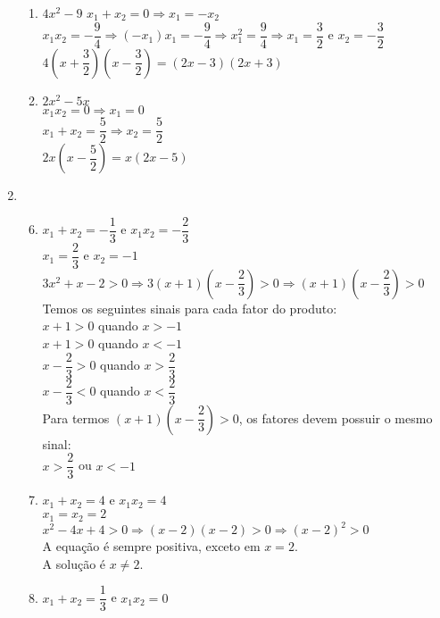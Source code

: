 \documentclass[10pt]{book}
\begin{document}
\begin{enumerate}
\begin{enumerate}
				
				\item %
				$4x^2 - 9$
				$x_{1} + x_{2} = 0 \Rightarrow x_{1} = -x_{2}$\\
				$x_{1}x_{2} = -\dfrac{9}{4} \Rightarrow (-x_{1})x_{1} = -\dfrac{9}{4} \Rightarrow x_{1}^2 = \dfrac{9}{4} \Rightarrow x_{1} = \dfrac{3}{2}$ e $x_{2} = -\dfrac{3}{2}$\\
				$4(x+\dfrac{3}{2})(x-\dfrac{3}{2}) = \boxed{(2x-3)(2x+3)}$
				\item %
				$2x^2 - 5x$\\
			 	$x_{1}x_{2} = 0 \Rightarrow x_{1} = 0$\\
			 	$x_{1} + x_{2} = \dfrac{5}{2} \Rightarrow x_{2}  = \dfrac{5}{2}$\\
			 	$2x(x-\dfrac{5}{2}) = \boxed{x(2x-5)}$
		\end{enumerate}
	\item %
		\begin{enumerate}
			\setcounter{enumii}{5}
			\item %
			$x_{1}+x_{2}= -\dfrac{1}{3}$ e $x_{1}x_{2}=-\dfrac{2}{3} $\\[6pt]
			$x_{1}=\dfrac{2}{3}$ e $x_{2}=-1$\\[6pt]
			$3x^2+x-2 > 0 \Rightarrow 3(x+1)(x-\dfrac{2}{3}) > 0 \Rightarrow (x+1)(x-\dfrac{2}{3}) > 0$\\[6pt]
			Temos os seguintes sinais para cada fator do produto:\\
			$x + 1 > 0$ quando $x > -1$\\
			$x + 1 > 0$ quando $x < -1$\\
			$x-\dfrac{2}{3} > 0$ quando $x > \dfrac{2}{3}$\\[6pt]
			$x-\dfrac{2}{3} < 0$ quando $x < \dfrac{2}{3}$\\[6pt]
			Para termos $(x+1)(x-\dfrac{2}{3}) > 0$, os fatores devem possuir o mesmo sinal:\\
			$x > \dfrac{2}{3}$ ou  $x < -1$
			\item %
			$x_{1}+x_{2}= 4$ e $x_{1}x_{2}= 4$\\
			$x_{1} = x_{2}= 2$\\
			$x^2-4x+4 > 0 \Rightarrow (x - 2)(x - 2) > 0 \Rightarrow (x-2)^2 >0$\\
			A equação é sempre positiva, exceto em $x = 2$.\\
			A solução é $x \neq 2$.
			\item %
			$x_{1}+x_{2}=\dfrac{1}{3}$ e $x_{1}x_{2}= 0$\\[6pt]

\end{enumerate}
\end{enumerate}
\end{document}
